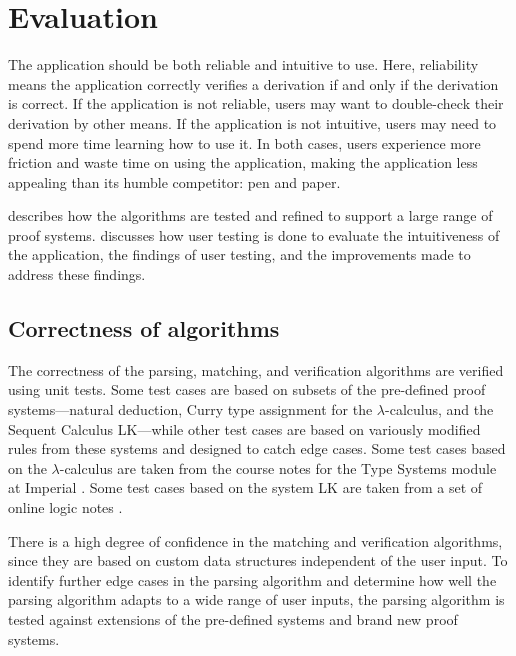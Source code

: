 \chapter{Evaluation}
The application should be both reliable and intuitive to use. Here, reliability means the application correctly verifies a derivation if and only if the derivation is correct. If the application is not reliable, users may want to double-check their derivation by other means. If the application is not intuitive, users may need to spend more time learning how to use it. In both cases, users experience more friction and waste time on using the application, making the application less appealing than its humble competitor: pen and paper.

 describes how the algorithms are tested and refined to support a large range of proof systems.  discusses how user testing is done to evaluate the intuitiveness of the application, the findings of user testing, and the improvements made to address these findings.

\section{Correctness of algorithms}
\label{evaluation:correctness}
The correctness of the parsing, matching, and verification algorithms are verified using unit tests. Some test cases are based on subsets of the pre-defined proof systems---natural deduction, Curry type assignment for the $\lambda$-calculus, and the Sequent Calculus LK---while other test cases are based on variously modified rules from these systems and designed to catch edge cases. Some test cases based on the $\lambda$-calculus are taken from the course notes for the Type Systems module at Imperial \cite{van-bakel:2022}. Some test cases based on the system LK are taken from a set of online logic notes \cite{sequent}.

There is a high degree of confidence in the matching and verification algorithms, since they are based on custom data structures independent of the user input. To identify further edge cases in the parsing algorithm and determine how well the parsing algorithm adapts to a wide range of user inputs, the parsing algorithm is tested against extensions of the pre-defined systems and brand new proof systems.

